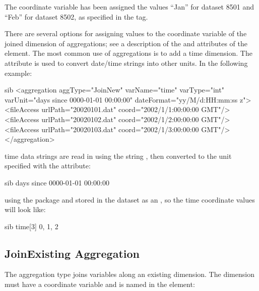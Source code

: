 \documentclass{dods-book}
\begin{document}
The coordinate variable  has been assigned the values
``Jan'' for dataset 8501 and ``Feb'' for dataset 8502, as specified in
the  tag.



There are several options for assigning values to the coordinate
variable of the joined dimension of  aggregations; see
a description of the  and  attributes of the
 element. The most common use of 
aggregations is to add a time dimension. The 
attribute is used to convert date/time strings into other units. In
the following example:

\begin{vcode}{sib}
<aggregation aggType="JoinNew" varName="time" varType="int" 
    varUnit="days since 0000-01-01 00:00:00" 
    dateFormat="yy/M/d:HH:mm:ss z">
<fileAccess 
    urlPath="20020101.dat" coord="2002/1/1:00:00:00 GMT"/>
<fileAccess 
    urlPath="20020102.dat" coord="2002/1/2:00:00:00 GMT"/>
<fileAccess 
    urlPath="20020103.dat" coord="2002/1/3:00:00:00 GMT"/>
</aggregation>
\end{vcode}

 time data strings are read in using the 
string , then converted to the unit specified
with the  attribute:

\begin{vcode}{sib}
  days since 0000-01-01 00:00:00
\end{vcode}

using the  package and stored in the dataset as an
, so the time coordinate values will look like:

\begin{vcode}{sib}
time[3]
0, 1, 2
\end{vcode}


\subsection{JoinExisting Aggregation}
\label{agg,joinexist}

The  aggregation type joins variables along an
existing dimension. The dimension must have a coordinate variable and
is named in the  element:
\end{document}
